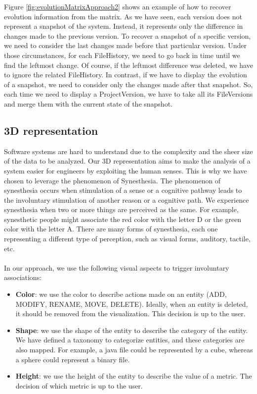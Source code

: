 Figure  \ref{fig:evolutionMatrixApproach2} shows an example of how to recover evolution information from the matrix. 
As we have seen, each version does not represent a snapshot of the system.
Instead, it represents only the difference in changes made to the previous version. 
To recover a snapshot of a specific version, we need to consider the last changes made before that particular version.
Under those circumstances, for each FileHistory, we need to go back in time until we find the leftmost change. Of course, if the leftmost difference was deleted, we have to ignore the related FileHistory.
In contrast, if we have to display the evolution of a snapshot, we need to consider only the changes made after that snapshot. 
So, each time we need to display a ProjectVersion, we have to take all its FileVersions and merge them with the current state of the snapshot. 



\subsection*{3D representation}
\label{s:3DRepr}

Software systems are hard to understand due to the complexity and the sheer size of the data to be analyzed.
Our 3D representation aims to make the analysis of a system easier for engineers by exploiting the human senses.
This is why we have chosen to leverage the phenomenon of Synesthesia.
The phenomenon of synesthesia occurs when stimulation of a sense or a cognitive pathway leads to the involuntary stimulation of another reason or a cognitive path.
We experience synesthesia when two or more things are perceived as the same. 
For example, synesthetic people might associate the red color with the letter D or the green color with the letter A. 
There are many forms of synesthesia, each one representing a different type of perception, such as visual forms, auditory, tactile, etc.\\
\\
In our approach, we use the following visual aspects to trigger involuntary associations:
\begin{itemize}
    \item \textbf{Color}: we use the color to describe actions made on an entity (ADD, MODIFY, RENAME, MOVE, DELETE). 
    Ideally, when an entity is deleted, it should be removed from the visualization. This decision is up to the user.  
    \item \textbf{Shape}: we use the shape of the entity to describe the category of the entity. 
    We have defined a taxonomy to categorize entities, and these categories are also mapped. 
    For example, a java file could be represented by a cube, whereas a sphere could represent a binary file.
    \item \textbf{Height}: we use the height of the entity to describe the value of a metric. The decision of which metric is up to the user.
\end{itemize}

